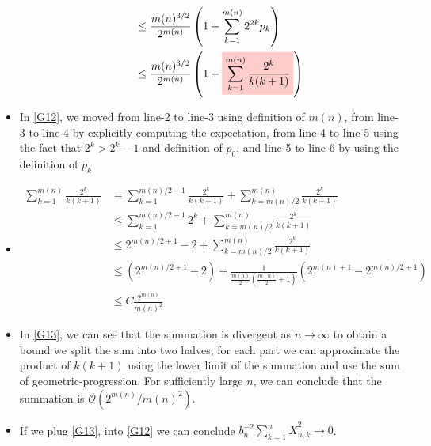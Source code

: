 \documentclass{article}
\newcommand{\bracket}[1]{\left(#1\right)}
\newcommand{\highlight}[1]{%
  \colorbox{red!20}{$\displaystyle#1$}}
\begin{document}
\begin{itemize}
\begin{itemize}
\begin{equation}
\begin{split}
                        &\leq  \frac{m(n)^{3/2}}{2^{m(n)}} \bracket{ 1 + \sum_{k=1}^{m(n)} 2^{2k} p_k }\\
                        &\leq  \frac{m(n)^{3/2}}{2^{m(n)}}\bracket{ 1 + \highlight{\sum_{k=1}^{m(n)} \frac{2^{k}}{k(k+1)}  }}
                    \end{split}
                \end{equation}
            \end{itemize}
    \item In \ref{G12}, we moved from line-2 to line-3 using definition of $m(n)$, from line-3 to line-4 by explicitly computing the expectation, from line-4 to line-5 using the fact that $2^k > 2^{k}-1$ and definition of $p_0$, and line-5 to line-6  by using the definition of $p_k$
    \item[] \begin{itemize}
                \begin{equation}
                    \label{G13}
                    \begin{split}
                        \sum_{k=1}^{m(n)} \frac{2^{k}}{k(k+1)} &=  \sum_{k=1}^{m(n)/2-1} \frac{2^{k}}{k(k+1)} +  \sum_{k=m(n)/2}^{m(n)} \frac{2^{k}}{k(k+1)}\\
                        &\leq \sum_{k=1}^{m(n)/2-1} 2^k +  \sum_{k=m(n)/2}^{m(n)} \frac{2^{k}}{k(k+1)}\\
                        &\leq 2^{m(n)/2+1} - 2 +  \sum_{k=m(n)/2}^{m(n)} \frac{2^{k}}{k(k+1)}\\
                        &\leq (2^{m(n)/2+1} - 2) + \frac{1}{\frac{m(n)}{2} \left(\frac{m(n)}{2} + 1\right)} (2^{m(n)+1} - 2^{m(n)/2+1})\\
                        &\leq C \frac{2^{m(n)}}{m(n)^2}
                    \end{split}
                \end{equation}
            \end{itemize}
    \item In \ref{G13}, we can see that the summation is divergent as $n\rightarrow \infty$ to obtain a bound we split the sum into two halves, for each part we can approximate the product of $k(k+1)$ using the lower limit of the summation and use the sum of geometric-progression. For sufficiently large $n$, we can conclude that the summation is $\mathcal{O}(2^{m(n)}/m(n)^2)$. 
    \item If we plug \ref{G13}, into \ref{G12} we can conclude $b_n^{-2}\sum_{k=1}^{n} \overline{X}^2_{n, k} \rightarrow 0$. 

\end{itemize}
\end{document}
